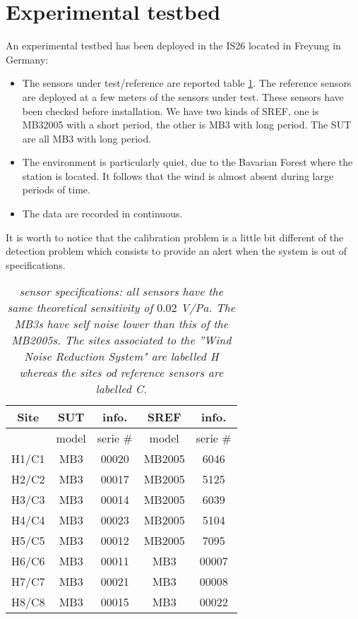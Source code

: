 \section{Experimental testbed}
An experimental testbed has been deployed in the IS26 located in Freyung in Germany:
\begin{itemize}
\item
The sensors under test/reference are reported table \ref{tab:sensor-specifications}. The reference sensors are deployed at a few meters of the sensors under test. These sensors have been checked before installation. We have two kinds of SREF, one is MB32005 with a short period, the other is MB3 with long period. The SUT are all MB3 with long period.
\item
The environment is particularly  quiet, due to the Bavarian Forest where the station is located. It follows that the wind is almost absent during large periods of time.

 \item
The data are recorded in continuous.
\end{itemize}

It is worth to notice that the calibration problem is a little bit  different of the detection problem which consists to provide an alert when the system is out of specifications.


\begin{table}
\begin{center}
\begin{tabular}{|c||cc|cc||}
\hline
Site & SUT & info.& SREF & info.
\\
\hline
     & model&serie \#     & model&serie \#
\\
H1/C1& MB3 & 00020  & MB2005& 6046
\\
H2/C2& MB3  &  00017  & MB2005& 5125
\\
H3/C3& MB3  &  00014  & MB2005 &6039
\\
H4/C4& MB3  &  00023  & MB2005& 5104
\\
H5/C5& MB3   & 00012  & MB2005 &7095
\\
H6/C6& MB3  &  00011  & MB3 &00007
\\
H7/C7& MB3   & 00021  & MB3 &00008
\\
H8/C8& MB3   & 00015  & MB3 &00022
\\
\hline
\end{tabular}
\parbox{12 cm}
{
    \caption{\protect\small\it  sensor specifications: all sensors have the same theoretical sensitivity of $0.02$ V/Pa. The MB3s have self noise lower than this of the MB2005s. The sites associated to the ''Wind Noise Reduction System" are labelled H whereas  the sites od reference sensors are labelled C.}
    \label{tab:sensor-specifications}
}
\end{center}
\end{table}

